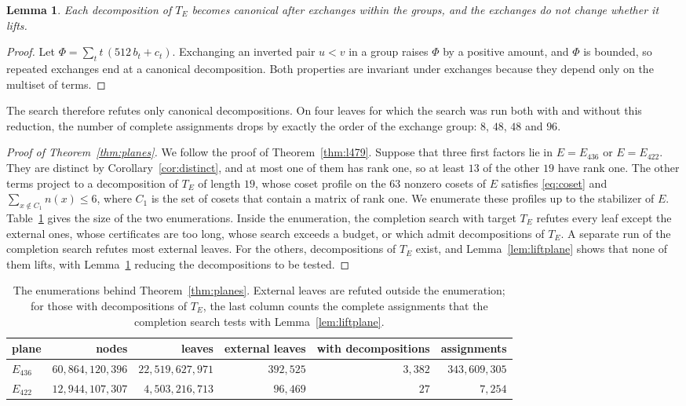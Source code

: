 \documentclass[11pt]{amsart}
\newtheorem{lemma}[theorem]{Lemma}
\theoremstyle{definition}
\theoremstyle{remark}
\numberwithin{equation}{section}
\begin{document}
\begin{lemma}\label{lem:eqf}
Each decomposition of $T_E$ becomes canonical after exchanges within the groups, and the exchanges do not change whether it lifts.
\end{lemma}

\begin{proof}
Let $\Phi=\sum_t t\,(512\,b_t+c_t)$. Exchanging an inverted pair $u<v$ in a group raises $\Phi$ by a positive amount, and $\Phi$ is bounded, so repeated exchanges end at a canonical decomposition. Both properties are invariant under exchanges because they depend only on the multiset of terms.
\end{proof}

The search therefore refutes only canonical decompositions. On four leaves for which the search was run both with and without this reduction, the number of complete assignments drops by exactly the order of the exchange group: $8$, $48$, $48$ and $96$.

\begin{proof}[Proof of Theorem~\ref{thm:planes}]
We follow the proof of Theorem~\ref{thm:l479}. Suppose that three first factors lie in $E=E_{436}$ or $E=E_{422}$. They are distinct by Corollary~\ref{cor:distinct}, and at most one of them has rank one, so at least $13$ of the other $19$ have rank one. The other terms project to a decomposition of $T_E$ of length $19$, whose coset profile on the $63$ nonzero cosets of $E$ satisfies \eqref{eq:coset} and $\sum_{x\notin C_1}n(x)\le 6$, where $C_1$ is the set of cosets that contain a matrix of rank one. We enumerate these profiles up to the stabilizer of $E$. Table~\ref{tab:planes} gives the size of the two enumerations. Inside the enumeration, the completion search with target $T_E$ refutes every leaf except the external ones, whose certificates are too long, whose search exceeds a budget, or which admit decompositions of $T_E$. A separate run of the completion search refutes most external leaves. For the others, decompositions of $T_E$ exist, and Lemma~\ref{lem:liftplane} shows that none of them lifts, with Lemma~\ref{lem:eqf} reducing the decompositions to be tested.
\end{proof}

\begin{table}[ht]
\caption{The enumerations behind Theorem~\ref{thm:planes}. External leaves are refuted outside the enumeration; for those with decompositions of $T_E$, the last column counts the complete assignments that the completion search tests with Lemma~\ref{lem:liftplane}.}\label{tab:planes}
\centering
\small
\begin{tabular}{@{}lrrrrr@{}}
\toprule
plane & nodes & leaves & external leaves & with decompositions & assignments\\
\midrule
$E_{436}$ & $60{,}864{,}120{,}396$ & $22{,}519{,}627{,}971$ & $392{,}525$ & $3{,}382$ & $343{,}609{,}305$\\
$E_{422}$ & $12{,}944{,}107{,}307$ & $4{,}503{,}216{,}713$ & $96{,}469$ & $27$ & $7{,}254$\\
\bottomrule
\end{tabular}
\end{table}
\end{document}
